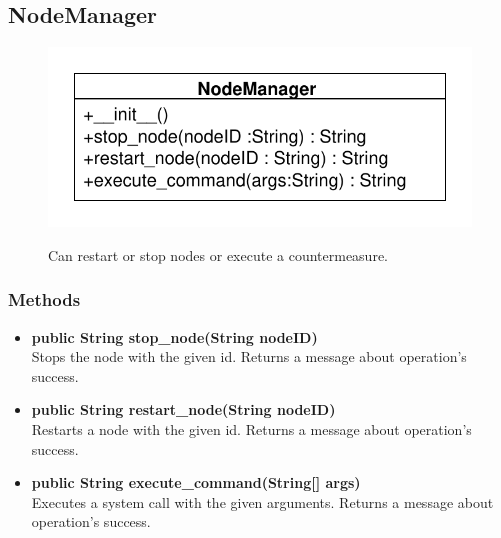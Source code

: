 \subsection{NodeManager}
\begin{figure}[htbp]
	\begin{minipage}[t]{7cm}
		\vspace{0pt}
		\centering
		\includegraphics[scale=0.6]{./diagram_pictures/NodeInterface/NodeManager.pdf}
	\end{minipage}
	\hfill
	\begin{minipage}[t]{8cm}
		\vspace{10pt}
		Can restart or stop nodes or execute a countermeasure.
	\end{minipage}
\end{figure}


\subsubsection{Methods}
\begin{itemize}
	\item \textbf{public String stop\_node(String nodeID)}\\
	Stops the node with the given id.
	Returns a message about operation's success.
	\item \textbf{public String restart\_node(String nodeID)}\\
	Restarts a node with the given id.
	Returns a message about operation's success.
	\item \textbf{public String execute\_command(String[] args)}\\
	Executes a system call with the given arguments.
	Returns a message about operation's success.
\end{itemize}

